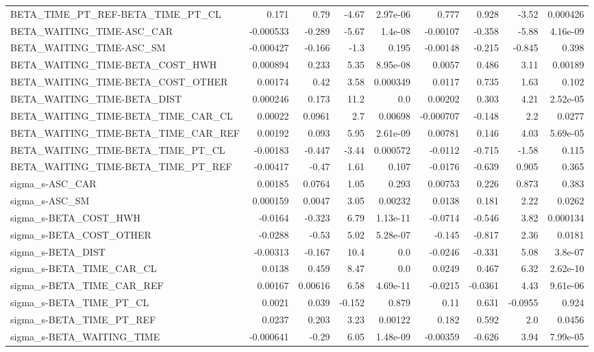 \begin{tabular}{lrrrrrrrr}
BETA_TIME_PT_REF-BETA_TIME_PT_CL & 0.171 & 0.79 & -4.67 & 2.97e-06 & 0.777 & 0.928 & -3.52 & 0.000426 \\
BETA_WAITING_TIME-ASC_CAR & -0.000533 & -0.289 & -5.67 & 1.4e-08 & -0.00107 & -0.358 & -5.88 & 4.16e-09 \\
BETA_WAITING_TIME-ASC_SM & -0.000427 & -0.166 & -1.3 & 0.195 & -0.00148 & -0.215 & -0.845 & 0.398 \\
BETA_WAITING_TIME-BETA_COST_HWH & 0.000894 & 0.233 & 5.35 & 8.95e-08 & 0.0057 & 0.486 & 3.11 & 0.00189 \\
BETA_WAITING_TIME-BETA_COST_OTHER & 0.00174 & 0.42 & 3.58 & 0.000349 & 0.0117 & 0.735 & 1.63 & 0.102 \\
BETA_WAITING_TIME-BETA_DIST & 0.000246 & 0.173 & 11.2 & 0.0 & 0.00202 & 0.303 & 4.21 & 2.52e-05 \\
BETA_WAITING_TIME-BETA_TIME_CAR_CL & 0.00022 & 0.0961 & 2.7 & 0.00698 & -0.000707 & -0.148 & 2.2 & 0.0277 \\
BETA_WAITING_TIME-BETA_TIME_CAR_REF & 0.00192 & 0.093 & 5.95 & 2.61e-09 & 0.00781 & 0.146 & 4.03 & 5.69e-05 \\
BETA_WAITING_TIME-BETA_TIME_PT_CL & -0.00183 & -0.447 & -3.44 & 0.000572 & -0.0112 & -0.715 & -1.58 & 0.115 \\
BETA_WAITING_TIME-BETA_TIME_PT_REF & -0.00417 & -0.47 & 1.61 & 0.107 & -0.0176 & -0.639 & 0.905 & 0.365 \\
sigma_s-ASC_CAR & 0.00185 & 0.0764 & 1.05 & 0.293 & 0.00753 & 0.226 & 0.873 & 0.383 \\
sigma_s-ASC_SM & 0.000159 & 0.0047 & 3.05 & 0.00232 & 0.0138 & 0.181 & 2.22 & 0.0262 \\
sigma_s-BETA_COST_HWH & -0.0164 & -0.323 & 6.79 & 1.13e-11 & -0.0714 & -0.546 & 3.82 & 0.000134 \\
sigma_s-BETA_COST_OTHER & -0.0288 & -0.53 & 5.02 & 5.28e-07 & -0.145 & -0.817 & 2.36 & 0.0181 \\
sigma_s-BETA_DIST & -0.00313 & -0.167 & 10.4 & 0.0 & -0.0246 & -0.331 & 5.08 & 3.8e-07 \\
sigma_s-BETA_TIME_CAR_CL & 0.0138 & 0.459 & 8.47 & 0.0 & 0.0249 & 0.467 & 6.32 & 2.62e-10 \\
sigma_s-BETA_TIME_CAR_REF & 0.00167 & 0.00616 & 6.58 & 4.69e-11 & -0.0215 & -0.0361 & 4.43 & 9.61e-06 \\
sigma_s-BETA_TIME_PT_CL & 0.0021 & 0.039 & -0.152 & 0.879 & 0.11 & 0.631 & -0.0955 & 0.924 \\
sigma_s-BETA_TIME_PT_REF & 0.0237 & 0.203 & 3.23 & 0.00122 & 0.182 & 0.592 & 2.0 & 0.0456 \\
sigma_s-BETA_WAITING_TIME & -0.000641 & -0.29 & 6.05 & 1.48e-09 & -0.00359 & -0.626 & 3.94 & 7.99e-05 \\
\end{tabular}

